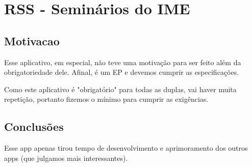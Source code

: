 \section{RSS - Seminários do IME}

\subsection{Motivacao}
Esse aplicativo, em especial, não teve uma motivação para ser feito além
da obrigatoriedade dele. Afinal, é um EP e devemos cumprir as
especificações.

Como este aplicativo é "obrigatório" para todas as duplas, vai haver muita
repetição, portanto fizemos o mínimo para cumprir as exigências.

\subsection{Conclusões}
Esse app apenas tirou tempo de desenvolvimento e aprimoramento dos outros
apps (que julgamos mais interessantes).
